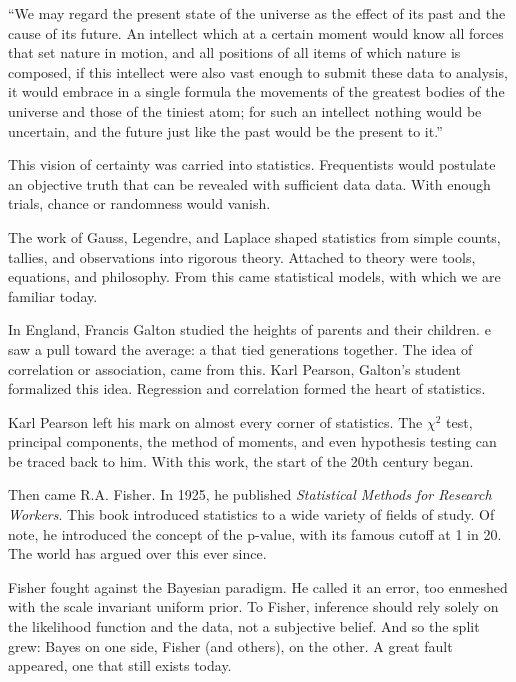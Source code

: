 \begin{displayquote} 
    “We may regard the present state of the universe as the effect of its past and the cause of its future. 
    An intellect which at a certain moment would know all forces that set nature in motion, and all positions of all items of which nature is composed, 
    if this intellect were also vast enough to submit these data to analysis, it would embrace in a single formula the movements of 
    the greatest bodies of the universe and those of the tiniest atom; for such an intellect nothing would be uncertain, 
    and the future just like the past would be the present to it.”
\end{displayquote}

This vision of certainty was carried into statistics.  
Frequentists would postulate an objective truth that can be revealed with sufficient data data.  
With enough trials, chance or randomness would vanish.  

The work of Gauss, Legendre, and Laplace shaped statistics from simple counts, tallies, and observations into rigorous theory.  
Attached to theory were tools, equations, and philosophy.  
From this came statistical models, with which we are familiar today.  

In England, Francis Galton studied the heights of parents and their children.  
e saw a pull toward the average: a  that tied generations together\cite{fienberg_review_1992}.  
The idea of correlation or association, came from this.  
Karl Pearson, Galton's student formalized this idea\cite{stanton_galton_2001}.  
Regression and correlation formed the heart of statistics\cite{stanton_galton_2001}.  

Karl Pearson left his mark on almost every corner of statistics.  
The \(\chi^2\) test, principal components, the method of moments, and even hypothesis testing can be traced back to him.  
With this work, the start of the 20th century began.  

Then came R.A. Fisher.  
In 1925, he published \emph{Statistical Methods for Research Workers}.  
This book introduced statistics to a wide variety of fields of study.  
Of note, he introduced the concept of the p-value, with its famous cutoff at 1 in 20.  
The world has argued over this ever since\cite{ranstam_why_2012}.

Fisher fought against the Bayesian paradigm.  
He called it an error, too enmeshed with the scale invariant uniform prior\cite{zabell_fisher_2022}.  
To Fisher, inference should rely solely on the likelihood function and the data, not a subjective belief.  
And so the split grew: Bayes on one side, Fisher (and others), on the other.  
A great fault appeared, one that still exists today.  

